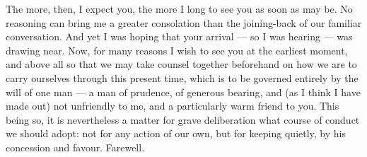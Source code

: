  The more, then, I expect you, the more I long to see you as soon as may be. No reasoning can bring me a greater consolation than the joining-back of our familiar conversation. And yet I was hoping that your arrival --- so I was hearing --- was drawing near. Now, for many reasons I wish to see you at the earliest moment, and above all so that we may take counsel together beforehand on how we are to carry ourselves through this present time, which is to be governed entirely by the will of one man --- a man of prudence, of generous bearing, and (as I think I have made out) not unfriendly to me, and a particularly warm friend to you. This being so, it is nevertheless a matter for grave deliberation what course of conduct we should adopt: not for any action of our own, but for keeping quietly, by his concession and favour. Farewell.
